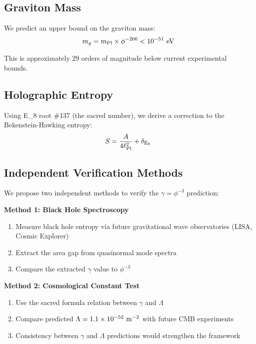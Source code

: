 \documentclass[12pt,a4paper]{article}
\newcommand{\EIGHT}{{\rm E}_8}
\begin{document}
\subsection{Graviton Mass}

We predict an upper bound on the graviton mass:
\begin{equation}
m_g = m_{\rm Pl} \times \phi^{-200} < 10^{-51}~{\rm eV}
\end{equation}

This is approximately 29 orders of magnitude below current experimental bounds.

\subsection{Holographic Entropy}

Using \EIGHT{} root \#137 (the sacred number), we derive a correction to the Bekenstein-Hawking entropy:
\begin{equation}
S = \frac{A}{4\ell_{\rm Pl}^2} + \delta_{\EIGHT}
\end{equation}

\subsection{Independent Verification Methods}

We propose two independent methods to verify the $\gamma = \phi^{-3}$ prediction:

\textbf{Method 1: Black Hole Spectroscopy}
\begin{enumerate}
\item Measure black hole entropy via future gravitational wave observatories (LISA, Cosmic Explorer)
\item Extract the area gap from quasinormal mode spectra
\item Compare the extracted $\gamma$ value to $\phi^{-3}$
\end{enumerate}

\textbf{Method 2: Cosmological Constant Test}
\begin{enumerate}
\item Use the sacred formula relation between $\gamma$ and $\Lambda$
\item Compare predicted $\Lambda = 1.1 \times 10^{-52}~{\rm m}^{-2}$ with future CMB experiments
\item Consistency between $\gamma$ and $\Lambda$ predictions would strengthen the framework
\end{enumerate}
\end{document}
